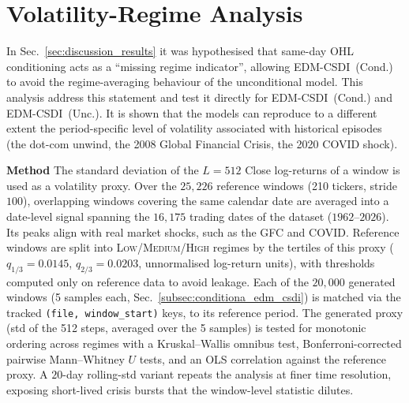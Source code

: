 \section{Volatility-Regime Analysis}
\label{app:sec:vol_regime}

In Sec.~\ref{sec:discussion_results} it was hypothesised that same-day OHL conditioning acts as a ``missing regime indicator'', allowing EDM-CSDI~(Cond.) to avoid the regime-averaging behaviour of the unconditional model. This analysis address this statement and test it directly for EDM-CSDI~(Cond.) and EDM-CSDI~(Unc.). It is shown that the models can reproduce to a different extent the  period-specific level of volatility associated with historical episodes (the dot-com unwind, the 2008 Global Financial Crisis, the 2020 COVID shock).

\textbf{Method} \quad The standard deviation of the \(L=512\) Close log-returns of a window is used as a volatility proxy. Over the \(25{,}226\) reference windows (210 tickers, stride \(100\)), overlapping windows covering the same calendar date are averaged into a date-level signal spanning the \(16{,}175\) trading dates of the dataset (\(1962\)--\(2026\)). Its peaks align with real market shocks, such as the GFC and COVID. Reference windows are split into \textsc{Low}/\textsc{Medium}/\textsc{High} regimes by the tertiles of this proxy (\(q_{1/3}=0.0145\), \(q_{2/3}=0.0203\), unnormalised log-return units), with thresholds computed only on reference data to avoid leakage. Each of the \(20{,}000\) generated windows (5 samples each, Sec.~\ref{subsec:conditiona_edm_csdi}) is matched via the tracked \texttt{(file, window\_start)} keys, to its reference period. The generated proxy (std of the 512 steps, averaged over the 5 samples) is tested for monotonic ordering across regimes with a Kruskal--Wallis omnibus test, Bonferroni-corrected pairwise Mann--Whitney \(U\) tests, and an OLS correlation against the reference proxy. A \(20\)-day rolling-std variant repeats the analysis at finer time resolution, exposing short-lived crisis bursts that the window-level statistic dilutes.

